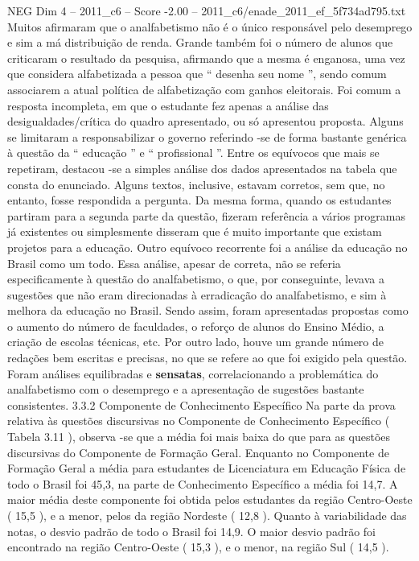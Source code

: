 \begin{textsample}{NEG Dim 4 – 2011\_c6 – Score -2.00 – 2011\_c6/enade\_2011\_ef\_5f734ad795.txt}
Muitos afirmaram que o analfabetismo não é o único responsável pelo desemprego e sim a má distribuição de renda.
Grande também foi o número de alunos que criticaram o resultado da pesquisa, afirmando que a mesma é enganosa, uma vez que considera alfabetizada a pessoa que “ desenha seu nome ”, sendo comum associarem a atual política de alfabetização com ganhos eleitorais.
Foi comum a resposta incompleta, em que o estudante fez apenas a análise das desigualdades/crítica do quadro apresentado, ou só apresentou proposta.
Alguns se limitaram a responsabilizar o governo referindo -se de forma bastante genérica à questão da “ educação ” e “ profissional ”.
Entre os equívocos que mais se repetiram, destacou -se a simples análise dos dados apresentados na tabela que consta do enunciado.
Alguns textos, inclusive, estavam corretos, sem que, no entanto, fosse respondida a pergunta.
Da mesma forma, quando os estudantes partiram para a segunda parte da questão, fizeram referência a vários programas já existentes ou simplesmente disseram que é muito importante que existam projetos para a educação.
Outro equívoco recorrente foi a análise da educação no Brasil como um todo.
Essa análise, apesar de correta, não se referia especificamente à questão do analfabetismo, o que, por conseguinte, levava a sugestões que não eram direcionadas à erradicação do analfabetismo, e sim à melhora da educação no Brasil.
Sendo assim, foram apresentadas propostas como o aumento do número de faculdades, o reforço de alunos do Ensino Médio, a criação de escolas técnicas, etc.
Por outro lado, houve um grande número de redações bem escritas e precisas, no que se refere ao que foi exigido pela questão.
Foram análises equilibradas e \textbf{sensatas}, correlacionando a problemática do analfabetismo com o desemprego e a apresentação de sugestões bastante consistentes. 3.3.2 Componente de Conhecimento Específico Na parte da prova relativa às questões discursivas no Componente de Conhecimento Específico ( Tabela 3.11 ), observa -se que a média foi mais baixa do que para as questões discursivas do Componente de Formação Geral.
Enquanto no Componente de Formação Geral a média para estudantes de Licenciatura em Educação Física de todo o Brasil foi 45,3, na parte de Conhecimento Específico a média foi 14,7.
A maior média deste componente foi obtida pelos estudantes da região Centro-Oeste ( 15,5 ), e a menor, pelos da região Nordeste ( 12,8 ).
Quanto à variabilidade das notas, o desvio padrão de todo o Brasil foi 14,9.
O maior desvio padrão foi encontrado na região Centro-Oeste ( 15,3 ), e o menor, na região Sul ( 14,5 ).

\end{textsample}
